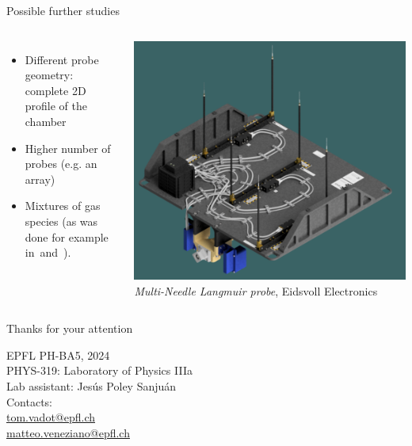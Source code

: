 \documentclass[10pt]{beamer}
\begin{document}
\begin{frame}{Possible further studies}
    \begin{columns}
        \begin{itemize}
            \itemsep10pt
            \item Different probe geometry: complete 2D profile of the chamber
            \item Higher number of probes (e.g. an array)
            \item Mixtures of gas species (as was done for example in\,  and\, ).
        \end{itemize}

        \centering
        \includegraphics[width=\textwidth]{../figures/langmuir-multi-needle.png}
        \small{\emph{Multi-Needle Langmuir probe}, Eidsvoll Electronics}
    \end{columns}
\end{frame}


\begin{frame}
    \vspace{3cm}
    \begin{center}
        \large Thanks for your attention      
    \end{center}
    \vspace{2cm}

    EPFL PH-BA5, 2024 \\
    PHYS-319: Laboratory of Physics IIIa\\
    Lab assistant: Jesús Poley Sanjuán \\
    Contacts: \\
    \quad \href{mailto:tom.vadot@epfl.ch}{tom.vadot@epfl.ch}\\
    \quad \href{mailto:matteo.veneziano@epfl.ch}{matteo.veneziano@epfl.ch}\\
     
\end{frame}
\end{document}
